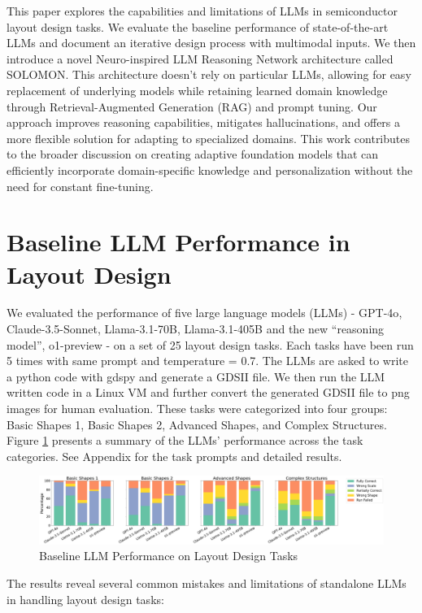 \documentclass{article}
\begin{document}
This paper explores the capabilities and limitations of LLMs in semiconductor layout design tasks. We evaluate the baseline performance of state-of-the-art LLMs and document an iterative design process with multimodal inputs. We then introduce a novel Neuro-inspired LLM Reasoning Network architecture called SOLOMON. This architecture doesn't rely on particular LLMs, allowing for easy replacement of underlying models while retaining learned domain knowledge through Retrieval-Augmented Generation (RAG) and prompt tuning. Our approach improves reasoning capabilities, mitigates hallucinations, and offers a more flexible solution for adapting to specialized domains. This work contributes to the broader discussion on creating adaptive foundation models that can efficiently incorporate domain-specific knowledge and personalization without the need for constant fine-tuning.

\section{Baseline LLM Performance in Layout Design}

We evaluated the performance of five large language models (LLMs) - GPT-4o\cite{GPT-4o}, Claude-3.5-Sonnet\cite{Claude-3.5-Sonnet}, Llama-3.1-70B\cite{Llama-3.1-70B}, Llama-3.1-405B\cite{Llama-3.1-405B} and the new ``reasoning model'', o1-preview\cite{o1-preview} - on a set of 25 layout design tasks. Each tasks have been run 5 times with same prompt and temperature = 0.7. The LLMs are asked to write a python code with gdspy\cite{gdspy} and generate a GDSII file. We then run the LLM written code in a Linux VM and further convert the generated GDSII file to png images for human evaluation. These tasks were categorized into four groups: Basic Shapes 1, Basic Shapes 2, Advanced Shapes, and Complex Structures. Figure \ref{fig:baseline-llm-performance} presents a summary of the LLMs' performance across the task categories. See Appendix for the task prompts and detailed results.
\begin{figure}[h]
  \centering
  \includegraphics[width=\textwidth]{baseline-llm-performance.png}
  \caption{Baseline LLM Performance on Layout Design Tasks}
  \label{fig:baseline-llm-performance}
\end{figure}
The results reveal several common mistakes and limitations of standalone LLMs in handling layout design tasks:
\end{document}
